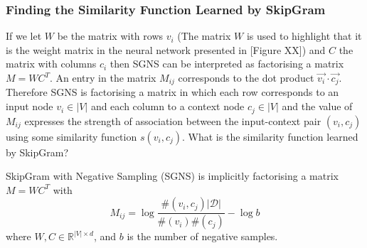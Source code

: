 \documentclass[a4paper]{article}
\begin{document}
\subsubsection{Finding the Similarity Function Learned by SkipGram}
If we let $W$ be the matrix with rows $v_i$ (The matrix $W$ is used to highlight
that it is the weight matrix in the neural network presented in [Figure XX]) and $C$ the matrix with columns
$c_i$ then SGNS can be interpreted as factorising a matrix $M = WC^T$. An entry in the matrix $M_{ij}$ corresponds to the dot product $\vec{v_i} \cdot
\vec{c_j}$. Therefore SGNS is factorising a matrix in which each row corresponds
to an input node $v_i \in |V|$ and each column to a context node $c_j \in |V|$ and the value of $M_{ij}$ expresses the
strength of association between the input-context pair $(v_i, c_j)$ using some similarity
function $s(v_i,c_j)$. What is the similarity function learned by SkipGram? 
\begin{theorem}
  SkipGram with Negative Sampling (SGNS) is implicitly factorising a matrix $M =
  WC^T$ with
  \[M_{ij} = \log{\frac{\#(v_i,c_j)|\mathcal{D}|}{\#(v_i)\#(c_j)}} - \log{b}\]
  where $W, C \in \mathbb{R}^{|V| \times d}$, and $b$ is the number of negative samples.
\end{theorem}
\end{document}
